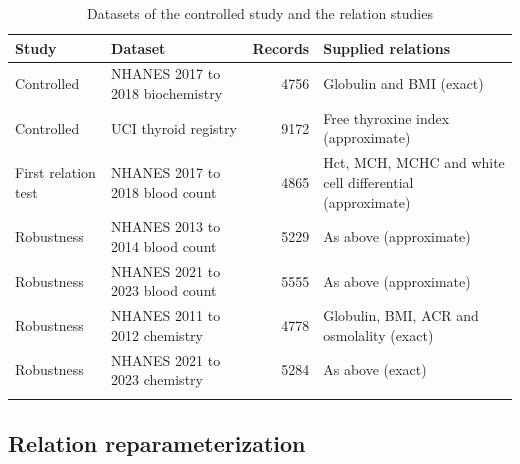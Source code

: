 \documentclass[pdflatex,referee]{sn-jnl}%
\begin{document}
\begin{table}[htbp]
\caption{Datasets of the controlled study and the relation studies}
\label{tab:data}
\footnotesize
\begin{tabular}{@{}>{\raggedright\arraybackslash}p{}>{\raggedright\arraybackslash}p{}r>{\raggedright\arraybackslash}p{}@{}}
\toprule
Study & Dataset & Records & Supplied relations \\
\midrule
Controlled & NHANES 2017 to 2018 biochemistry & 4756 & Globulin and BMI (exact) \\
Controlled & UCI thyroid registry & 9172 & Free thyroxine index (approximate) \\
First relation test & NHANES 2017 to 2018 blood count & 4865 & Hct, MCH, MCHC and white cell differential (approximate) \\
Robustness & NHANES 2013 to 2014 blood count & 5229 & As above (approximate) \\
Robustness & NHANES 2021 to 2023 blood count & 5555 & As above (approximate) \\
Robustness & NHANES 2011 to 2012 chemistry & 4778 & Globulin, BMI, ACR and osmolality (exact) \\
Robustness & NHANES 2021 to 2023 chemistry & 5284 & As above (exact) \\
\botrule
\end{tabular}
\end{table}

\subsection*{Relation reparameterization}
\end{document}
